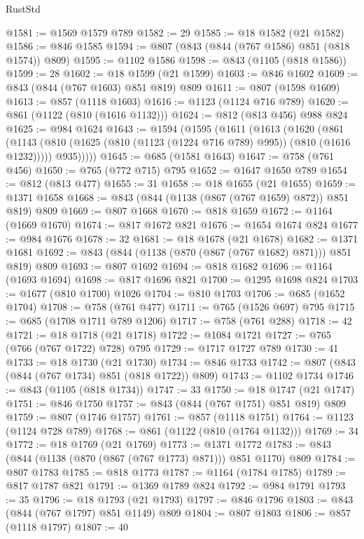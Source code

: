 \begin{lexlean}{RustStd}
\begin{coremodule}
@1581 := @1569 @1579 @789
@1582 := 29
@1585 := @18 @1582 (@21 @1582)
@1586 := @846 @1585
@1594 := @807 (@843 (@844 (@767 @1586) @851 (@818 @1574)) @809)
@1595 := @1102 @1586
@1598 := @843 (@1105 (@818 @1586))
@1599 := 28
@1602 := @18 @1599 (@21 @1599)
@1603 := @846 @1602
@1609 := @843 (@844 (@767 @1603) @851 @819) @809
@1611 := @807 (@1598 @1609)
@1613 := @857 (@1118 @1603)
@1616 := @1123 (@1124 @716 @789)
@1620 := @861 (@1122 (@810 (@1616 @1132)))
@1624 := @812 (@813 @456) @988 @824
@1625 := @984 @1624
@1643 := @1594
    (@1595
      (@1611
        (@1613
          (@1620
            (@861
              (@1143 (@810 (@1625 (@810 (@1123 (@1224 @716 @789) @995)) (@810 (@1616 @1232)))))
              @935)))))
@1645 := @685 (@1581 @1643)
@1647 := @758 (@761 @456)
@1650 := @765 (@772 @715) @795
@1652 := @1647 @1650 @789
@1654 := @812 (@813 @477)
@1655 := 31
@1658 := @18 @1655 (@21 @1655)
@1659 := @1371 @1658
@1668 := @843 (@844 (@1138 (@867 (@767 @1659) @872)) @851 @819) @809
@1669 := @807 @1668
@1670 := @818 @1659
@1672 := @1164 (@1669 @1670)
@1674 := @817 @1672 @821
@1676 := @1654 @1674 @824
@1677 := @984 @1676
@1678 := 32
@1681 := @18 @1678 (@21 @1678)
@1682 := @1371 @1681
@1692 := @843 (@844 (@1138 (@870 (@867 (@767 @1682) @871))) @851 @819) @809
@1693 := @807 @1692
@1694 := @818 @1682
@1696 := @1164 (@1693 @1694)
@1698 := @817 @1696 @821
@1700 := @1295 @1698 @824
@1703 := @1677 (@810 @1700) @1026
@1704 := @810 @1703
@1706 := @685 (@1652 @1704)
@1708 := @758 (@761 @477)
@1711 := @765 (@1526 @697) @795
@1715 := @685 (@1708 @1711 @789 @1206)
@1717 := @758 (@761 @288)
@1718 := 42
@1721 := @18 @1718 (@21 @1718)
@1722 := @1084 @1721
@1727 := @765 (@766 (@767 @1722) @728) @795
@1729 := @1717 @1727 @789
@1730 := 41
@1733 := @18 @1730 (@21 @1730)
@1734 := @846 @1733
@1742 := @807 (@843 (@844 (@767 @1734) @851 (@818 @1722)) @809)
@1743 := @1102 @1734
@1746 := @843 (@1105 (@818 @1734))
@1747 := 33
@1750 := @18 @1747 (@21 @1747)
@1751 := @846 @1750
@1757 := @843 (@844 (@767 @1751) @851 @819) @809
@1759 := @807 (@1746 @1757)
@1761 := @857 (@1118 @1751)
@1764 := @1123 (@1124 @728 @789)
@1768 := @861 (@1122 (@810 (@1764 @1132)))
@1769 := 34
@1772 := @18 @1769 (@21 @1769)
@1773 := @1371 @1772
@1783 := @843 (@844 (@1138 (@870 (@867 (@767 @1773) @871))) @851 @1170) @809
@1784 := @807 @1783
@1785 := @818 @1773
@1787 := @1164 (@1784 @1785)
@1789 := @817 @1787 @821
@1791 := @1369 @1789 @824
@1792 := @984 @1791
@1793 := 35
@1796 := @18 @1793 (@21 @1793)
@1797 := @846 @1796
@1803 := @843 (@844 (@767 @1797) @851 @1149) @809
@1804 := @807 @1803
@1806 := @857 (@1118 @1797)
@1807 := 40

\end{coremodule}
\end{lexlean}
